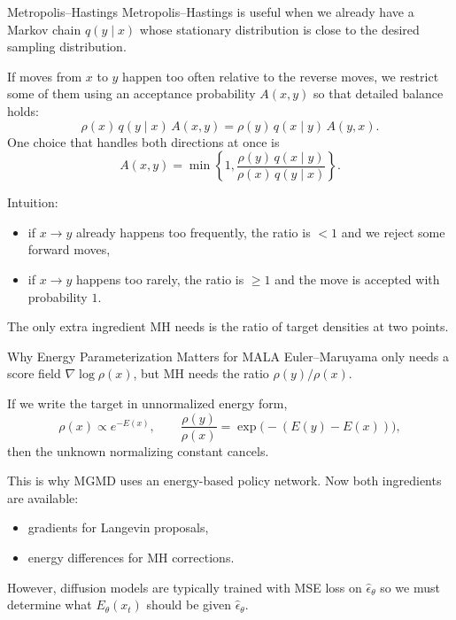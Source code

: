 \documentclass[aspectratio=169,11pt]{beamer}
\begin{document}
\begin{frame}{Metropolis--Hastings}
\small
Metropolis--Hastings is useful when we already have a Markov chain $q(y\mid x)$ whose stationary distribution is close to the desired sampling distribution.

\medskip
If moves from $x$ to $y$ happen too often relative to the reverse moves, we restrict some of them using an acceptance probability $A(x,y)$ so that detailed balance holds:
\[
\rho(x)\,q(y\mid x)\,A(x,y)
=
\rho(y)\,q(x\mid y)\,A(y,x).
\]
One choice that handles both directions at once is
\[
A(x,y)=\min\!\left\{1,\frac{\rho(y)\,q(x\mid y)}{\rho(x)\,q(y\mid x)}\right\}.
\]

\medskip
Intuition:
\begin{itemize}
  \item if $x\to y$ already happens too frequently, the ratio is $<1$ and we reject some forward moves,
  \item if $x\to y$ happens too rarely, the ratio is $\ge 1$ and the move is accepted with probability $1$.
\end{itemize}
The only extra ingredient MH needs is the ratio of target densities at two points.
\end{frame}

\begin{frame}{Why Energy Parameterization Matters for MALA}
\small
Euler--Maruyama only needs a score field $\nabla \log \rho(x)$, but MH needs the ratio $\rho(y)/\rho(x)$.

 \medskip
 If we write the target in unnormalized energy form,
 \[
 \rho(x)\propto e^{-E(x)},
 \qquad
 \frac{\rho(y)}{\rho(x)} = \exp\bigl(-(E(y)-E(x))\bigr),
 \]
 then the unknown normalizing constant cancels.

 \medskip
This is why MGMD uses an energy-based policy network. Now both ingredients are available:
  \begin{itemize}
    \item gradients for Langevin proposals,
    \item energy differences for MH corrections.
  \end{itemize}
  However, diffusion models are typically trained with MSE loss on $\hat\epsilon_\theta$ so we must determine what $E_\theta(x_t)$ should be given $\hat\epsilon_\theta$.
 \end{frame}
\end{document}
